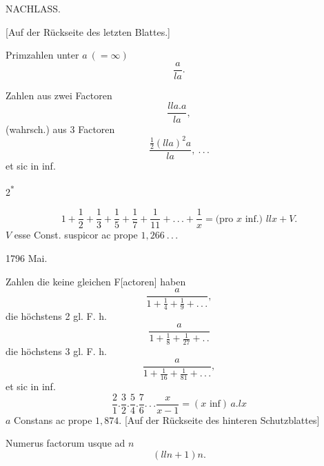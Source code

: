 \NoSourceHead
{}
\begin{center}\large NACHLASS.\end{center}

\noindent\small [Auf der Rückseite des letzten Blattes.]\normalsize
{}
\par\indent Primzahlen unter \(a\ (=\infty)\)
\[
\frac{a}{la}.
\]
\ClosingRule
{}
\par\indent Zahlen aus zwei Factoren
\[
\frac{lla.a}{la},
\]
\noindent (wahrsch.) aus 3 Factoren
\[
\frac{\frac12(lla)^2a}{la},\ .\,.\,.
\]
\noindent et sic in inf.
\ClosingRule
\vfill\begin{flushright}\small 2\textsuperscript{*}\end{flushright}
\clearpage
{}
\[
1+\frac12+\frac13+\frac15+\frac17+\frac1{11}+.\,.\,.+\frac1x
=\text{(pro }x\text{ inf.) }llx+V.
\]
\noindent \(V\) esse Const. suspicor ac prope \(1,266\ .\,.\,.\)
\begin{flushright}1796 Mai.\end{flushright}
\ClosingRule
{}
\par\indent Zahlen die keine gleichen F[actoren] haben
\[
\frac{a}{1+\frac14+\frac19+.\,.\,.},
\]
\noindent die höchstens 2 gl. F. h.
\[
\frac{a}{1+\frac18+\frac1{27}+.\,.}
\]
\noindent die höchstens 3 gl. F. h.
\[
\frac{a}{1+\frac1{16}+\frac1{81}+.\,.\,.},
\]
\noindent et sic in inf.
\ClosingRule
{}
\[
\frac21.\frac32.\frac54.\frac76.\,.\,.\frac{x}{x-1}
=(x\text{ inf})\,a.lx
\]
\noindent \(a\) Constans ac prope \(1,874\).
\ClosingRule
\bigskip\noindent\small [Auf der Rückseite des hinteren Schutzblattes]\normalsize
{}
\par\indent Numerus factorum usque ad \(n\)
\[
(lln+1)n.
\]
\clearpage
